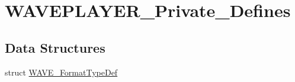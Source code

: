 \hypertarget{group___w_a_v_e_p_l_a_y_e_r___private___defines}{\section{W\-A\-V\-E\-P\-L\-A\-Y\-E\-R\-\_\-\-Private\-\_\-\-Defines}
\label{group___w_a_v_e_p_l_a_y_e_r___private___defines}
}
\subsection*{Data Structures}
\begin{DoxyCompactItemize}
\item 
struct \hyperlink{struct_w_a_v_e___format_type_def}{W\-A\-V\-E\-\_\-\-Format\-Type\-Def}
\end{DoxyCompactItemize}
